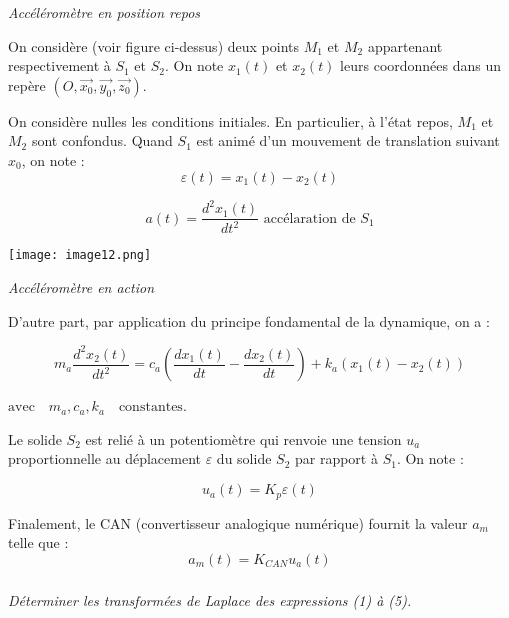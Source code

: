 \begin{multicols}{2}
\begin{center}
\textit{Accéléromètre en position repos}
\end{center}

On considère (voir figure ci-dessus) deux points $M_1$ et $M_2$ appartenant respectivement à $S_1$ et $S_2$. On note
$x_1(t)$ et $x_2(t)$ leurs coordonnées dans un repère 
$\left(O,\overrightarrow{x_0},\overrightarrow{y_0},\overrightarrow{z_0}\right)$.

On considère nulles les conditions initiales. En particulier, à l’état repos, $M_1$ et $M_2$ sont confondus.
Quand $S_1$ est animé d’un mouvement de translation suivant $x_0$, on note :
\begin{equation}
\varepsilon(t)=x_1(t)-x_2(t)
\end{equation}

\begin{equation}
a(t)=\dfrac{d^2x_1(t)}{dt^2} \text{ accélaration de } S_1
\end{equation}


\begin{center}
\texttt{[image: image12.png]}

\textit{Accéléromètre en action}
\end{center}

D’autre part, par application du principe fondamental de la dynamique, on a :

\begin{equation}
m_a\dfrac{d^2x_2(t)}{dt^2}=c_a\left( \dfrac{dx_1(t)}{dt} - \dfrac{dx_2(t)}{dt}\right)
+k_a\left( x_1(t)-x_2(t)\right) 
\end{equation}

$\mathrm{avec} \quad m_a, c_a, k_a \quad \mathrm{constantes}$.

Le solide $S_2$ est relié à un potentiomètre qui renvoie une tension $u_a$ proportionnelle au déplacement $\varepsilon$ du solide $S_2$ par rapport à $S_1$. On note : 

\begin{equation}
u_a(t)=K_p \varepsilon(t)
\end{equation}

Finalement, le CAN (convertisseur analogique numérique) fournit la valeur $a_m$ telle que :
\begin{equation}
a_m(t) = K_{CAN} u_a (t) 
\end{equation}

\fi

\subparagraph{}
\textit{Déterminer les transformées de Laplace des expressions (1) à (5).}
\ifprof
\begin{corrige}


\end{corrige}
\end{multicols}
